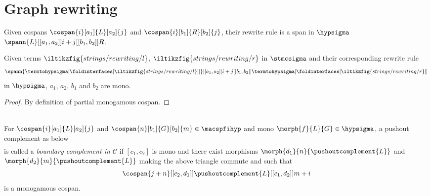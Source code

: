 \section{Graph rewriting}

\begin{definition}
    Given cospans \(
        \cospan{i}[a_1]{L}[a_2]{j}
    \) and \(
        \cospan{i}[b_1]{R}[b_2]{j}
    \), their rewrite rule is a span in \(\hypsigma\) \(
        \spann{L}[[a_1,a_2]]{i+j}[[b_1,b_2]]{R}
    \).
\end{definition}

\begin{lemma}
    Given terms \(
        \iltikzfig{strings/rewriting/l}
    \), \(
        \iltikzfig{strings/rewriting/r}
    \) in \(\stmcsigma\) and their corresponding rewrite rule \[
        \spann{
            \termtohypsigma[\foldinterfaces[\iltikzfig{strings/rewriting/l}]]
        }[[a_1, a_2]]{
            i + j
        }[[b_1, b_2]]{
            \termtohypsigma[\foldinterfaces[\iltikzfig{strings/rewriting/r}]]
        }
    \] in \(\hypsigma\), \(a_1\), \(a_2\), \(b_1\) and \(b_2\) are mono.
\end{lemma}
\begin{proof}
    By definition of partial monogamous cospan.
\end{proof}

\begin{definition}[DPO]
    \begin{gather}
        \label{gath:dpo}
        
    \end{gather}
\end{definition}

\begin{definition}\label{def:boundary-complement}
    For \(
        \cospan{i}[a_1]{L}[a_2]{j}
    \) and \(
        \cospan{n}[b_1]{G}[b_2]{m} \in \macspfihyp
    \) and mono \(
        \morph{f}{L}{G} \in \hypsigma
    \), a pushout complement as below
    \begin{gather}
        
    \end{gather}
    is called a \emph{boundary complement in \(\mathcal{C}\)} if \([c_1, c_2]\)
    is mono and there exist morphisms \(
        \morph{d_1}{n}{\pushoutcomplement{L}}
    \) and \(
        \morph{d_2}{m}{\pushoutcomplement{L}}
    \) making the above triangle commute and such that \[
        \cospan{j+n}[[c_2,d_1]]{\pushoutcomplement{L}}[[c_1,d_2]]{{m+i}}
    \] is a monogamous cospan.
\end{definition}

